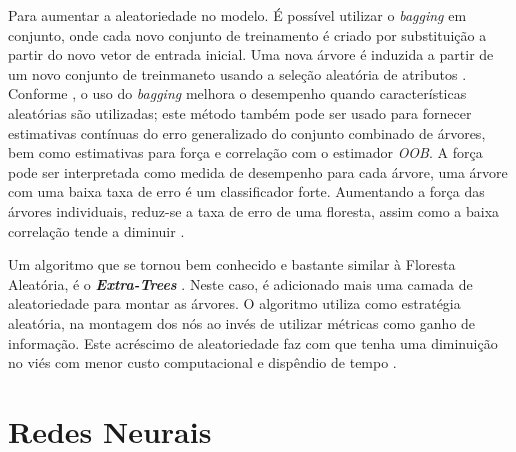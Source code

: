 \documentclass[
  openany]{book}
\begin{document}
Para aumentar a aleatoriedade no modelo. É possível utilizar o \emph{bagging} em conjunto, onde cada novo conjunto de treinamento é criado por substituição a partir do novo vetor de entrada inicial. Uma nova árvore é induzida a partir de um novo conjunto de treinmaneto usando a seleção aleatória de atributos \citep{gomez2012random}. Conforme \citep{breiman2001random}, o uso do \emph{bagging} melhora o desempenho quando características aleatórias são utilizadas; este método também pode ser usado para fornecer estimativas contínuas do erro generalizado do conjunto combinado de árvores, bem como estimativas para força e correlação com o estimador \emph{OOB}. A força pode ser interpretada como medida de desempenho para cada árvore, uma árvore com uma baixa taxa de erro é um classificador forte. Aumentando a força das árvores individuais, reduz-se a taxa de erro de uma floresta, assim como a baixa correlação tende a diminuir \citep{oshiro2013abordagem}.

Um algoritmo que se tornou bem conhecido e bastante similar à Floresta Aleatória, é o \textbf{\emph{Extra-Trees}} \citep{geurts2006extremely}. Neste caso, é adicionado mais uma camada de aleatoriedade para montar as árvores. O algoritmo utiliza como estratégia aleatória, na montagem dos nós ao invés de utilizar métricas como ganho de informação. Este acréscimo de aleatoriedade faz com que tenha uma diminuição no viés com menor custo computacional e dispêndio de tempo \citep{machado2020avaliaccao}.

\hypertarget{redesneurais}{%
\chapter{Redes Neurais}\label{redesneurais}}

  
\end{document}
